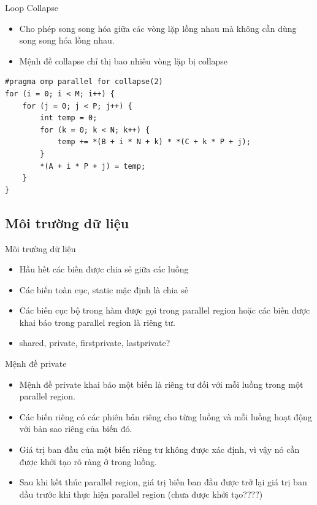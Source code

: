 \documentclass[10pt]{beamer}
\theoremstyle{remark}
\numberwithin{algocf}{section}
\numberwithin{equation}{section}
\numberwithin{dl}{section}
\numberwithin{figure}{section}
\begin{document}
\begin{frame}[fragile]{Loop Collapse}
    \begin{itemize}
        \item Cho phép song song hóa giữa các vòng lặp lồng nhau mà không cần dùng song song hóa lồng nhau.
        \item Mệnh đề collapse chỉ thị bao nhiêu vòng lặp bị collapse
    \end{itemize}
    \begin{verbatim}
#pragma omp parallel for collapse(2)
for (i = 0; i < M; i++) {
    for (j = 0; j < P; j++) {
        int temp = 0;
        for (k = 0; k < N; k++) {
            temp += *(B + i * N + k) * *(C + k * P + j);
        }
        *(A + i * P + j) = temp;
    }
}
    \end{verbatim}
\end{frame}

\subsection{Môi trường dữ liệu}

\begin{frame}{Môi trường dữ liệu}
    \begin{itemize}
        \item Hầu hết các biến được chia sẻ giữa các luồng
        \item Các biến toàn cục, static mặc định là chia sẻ
        \item Các biến cục bộ trong hàm được gọi trong parallel region hoặc các biến được khai báo trong parallel region là riêng tư.
        \item shared, private, firstprivate, lastprivate?
    \end{itemize}
\end{frame}

\begin{frame}{Mệnh đề private}
    \begin{itemize}
        \item Mệnh đề private khai báo một biến là riêng tư đối với mỗi luồng trong một parallel region.
        \item Các biến riêng có các phiên bản riêng cho từng luồng và mỗi luồng hoạt động với bản sao riêng của biến đó.
        \item Giá trị ban đầu của một biến riêng tư không được xác định, vì vậy nó cần được khởi tạo rõ ràng ở trong luồng.
        \item Sau khi kết thúc parallel region, giá trị biến ban đầu được trở lại giá trị ban đầu trước khi thực hiện parallel region (chưa được khởi tạo????)
    \end{itemize}
\end{frame}
\end{document}
